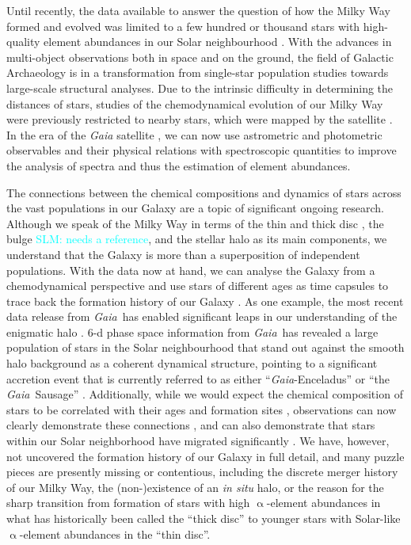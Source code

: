 \documentclass[fleqn,usenatbib,useAMS]{mnras}
\newcommand{\Gaia}{\textit{Gaia}\xspace}
\newcommand{\Hipparcos}{{\sc{Hipparcos}}\xspace}
\newcommand\SLM[1]{\textcolor{cyan}{SLM: #1}}
\begin{document}
Until recently, the data available to answer the question of how the Milky Way formed and evolved was limited to a few hundred or thousand stars with high-quality element abundances in our Solar neighbourhood \citep[see e.g.][]{Edvardsson1993, Nissen2010, Bensby2014}. With the advances in multi-object observations both in space and on the ground, the field of Galactic Archaeology is in a transformation from single-star population studies towards large-scale structural analyses. Due to the intrinsic difficulty in determining the distances of stars, studies of the chemodynamical evolution of our Milky Way were previously restricted to nearby stars, which were mapped by the \Hipparcos satellite \citep{ESA1997, Perryman1997, vanLeeuwen2007}. In the era of the \Gaia satellite \citep{Gaia-Collaboration2016, Gaia2016, Brown2018}, we can now use astrometric and photometric observables and their physical relations with spectroscopic quantities to improve the analysis of spectra and thus the estimation of element abundances.

The connections between the chemical compositions and dynamics of stars across the vast populations in our Galaxy are a topic of significant ongoing research. Although we speak of the Milky Way in terms of the thin and thick disc \citep{Yoshii1982, Gilmore1983}, the bulge \SLM{needs a reference}, and the stellar halo \citep[see e.g.][]{BlandHawthorn_Gerhard2016} as its main components, we understand that the Galaxy is more than a superposition of independent populations. With the data now at hand, we can analyse the Galaxy from a chemodynamical perspective and use stars of different ages as time capsules to trace back the formation history of our Galaxy \citep[see e.g.][]{Rix2013, BlandHawthorn2019}. As one example, the most recent data release from \Gaia\ has enabled significant leaps in our understanding of the enigmatic halo \citep[for an overview see][]{Helmi2020}. 6-d phase space information from \Gaia\ has revealed a large population of stars in the Solar neighbourhood that stand out against the smooth halo background as a coherent dynamical structure, pointing to a significant accretion event that is currently referred to as either ``\Gaia-Enceladus'' \citep{Helmi2018} or ``the \Gaia\ Sausage'' \citep{Belokurov2018}. Additionally, while we would expect the chemical composition of stars to be correlated with their ages and formation sites \citep[see e.g.][]{Minchev2017}, observations can now clearly demonstrate these connections \citep[see e.g.][]{Feuillet2018, Buder2019}, and can also demonstrate that stars within our Solar neighborhood have migrated significantly  \citep[see e.g.][]{Frankel2018, Hayden2020}. We have, however, not uncovered the formation history of our Galaxy in full detail, and many puzzle pieces are presently missing or contentious, including the discrete merger history of our Milky Way, the (non-)existence of an \textit{in situ} halo, or the reason for the sharp transition from formation of stars with high $\upalpha$-element abundances in what has historically been called the ``thick disc'' to younger stars with Solar-like $\upalpha$-element abundances in the ``thin disc''.
\end{document}
